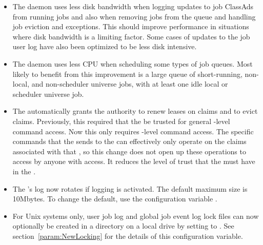 \begin{itemize}

\item The  daemon uses less disk bandwidth when logging
updates to job ClassAds from running jobs and also when removing jobs
from the queue and handling job eviction and  exceptions.
This should improve performance in situations where
disk bandwidth is a limiting factor.
Some cases of updates to the job user log
have also been optimized to be less disk intensive.

\item The  daemon uses less CPU when scheduling
some types of job queues.  Most likely to benefit from this improvement is
a large queue of short-running, non-local, and non-scheduler universe jobs,
with at least one idle local or scheduler universe job.

\item The  automatically grants the 
  authority to renew leases on claims and to evict claims.
  Previously, this required that the  be trusted for
  general -level command access.  Now this only
  requires -level command access.  The specific commands
  that the  sends to the  can
  effectively only operate on the claims associated with that ,
  so this change does not open up these operations to access by anyone
  with  access.  It reduces the level of trust that
  the  must have in the .

\item The 's log now rotates if logging is activated. 
  The default maximum size is 10Mbytes. To change the default,
  use the configuration variable .  

\item For Unix systems only, 
  user job log and global job event log lock files can now optionally 
  be created in a directory on a 
  local drive by setting  to . 
  See section~\ref{param:NewLocking} for 
  the details of this configuration variable.
  

\end{itemize}

